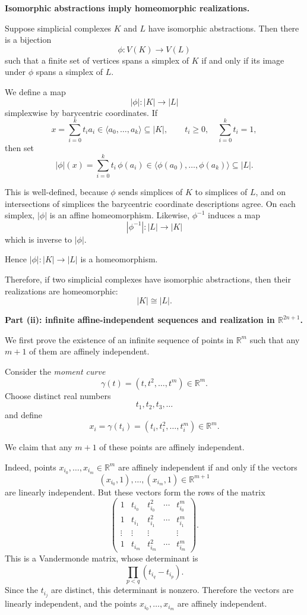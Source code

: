 \documentclass[12pt,a4paper]{article}
\theoremstyle{notespace}
\begin{document}
\medskip

\textbf{Isomorphic abstractions imply homeomorphic realizations.}

Suppose simplicial complexes \(K\) and \(L\) have isomorphic abstractions. Then there is a bijection
\[
\phi:V(K)\to V(L)
\]
such that a finite set of vertices spans a simplex of \(K\) if and only if its image under \(\phi\) spans a simplex of \(L\).

We define a map
\[
|\phi|:|K|\to |L|
\]
simplexwise by barycentric coordinates. If
\[
x=\sum_{i=0}^k t_i a_i\in \langle a_0,\dots,a_k\rangle\subseteq |K|,
\qquad t_i\ge 0,\quad \sum_{i=0}^k t_i=1,
\]
then set
\[
|\phi|(x)=\sum_{i=0}^k t_i\,\phi(a_i)\in \langle \phi(a_0),\dots,\phi(a_k)\rangle\subseteq |L|.
\]

This is well-defined, because \(\phi\) sends simplices of \(K\) to simplices of \(L\), and on intersections of simplices the barycentric coordinate descriptions agree. On each simplex, \(|\phi|\) is an affine homeomorphism. Likewise, \(\phi^{-1}\) induces a map
\[
|\phi^{-1}|:|L|\to |K|
\]
which is inverse to \(|\phi|\).

Hence \(|\phi|:|K|\to |L|\) is a homeomorphism.

Therefore, if two simplicial complexes have isomorphic abstractions, then their realizations are homeomorphic:
\[
|K|\cong |L|.
\]

\bigskip

\textbf{Part (ii): infinite affine-independent sequences and realization in \(\mathbb R^{2n+1}\).}

We first prove the existence of an infinite sequence of points in \(\mathbb R^m\) such that any \(m+1\) of them are affinely independent.

Consider the \emph{moment curve}
\[
\gamma(t)=(t,t^2,\dots,t^m)\in \mathbb R^m.
\]
Choose distinct real numbers
\[
t_1,t_2,t_3,\dots
\]
and define
\[
x_i=\gamma(t_i)=(t_i,t_i^2,\dots,t_i^m)\in \mathbb R^m.
\]

We claim that any \(m+1\) of these points are affinely independent.

Indeed, points \(x_{i_0},\dots,x_{i_m}\in \mathbb R^m\) are affinely independent if and only if the vectors
\[
(x_{i_0},1),\dots,(x_{i_m},1)\in \mathbb R^{m+1}
\]
are linearly independent. But these vectors form the rows of the matrix
\[
\begin{pmatrix}
	1 & t_{i_0} & t_{i_0}^2 & \cdots & t_{i_0}^m\\
	1 & t_{i_1} & t_{i_1}^2 & \cdots & t_{i_1}^m\\
	\vdots & \vdots & \vdots & & \vdots\\
	1 & t_{i_m} & t_{i_m}^2 & \cdots & t_{i_m}^m
\end{pmatrix}.
\]
This is a Vandermonde matrix, whose determinant is
\[
\prod_{p<q}(t_{i_q}-t_{i_p}).
\]
Since the \(t_{i_j}\) are distinct, this determinant is nonzero. Therefore the vectors are linearly independent, and the points \(x_{i_0},\dots,x_{i_m}\) are affinely independent.
\end{document}
